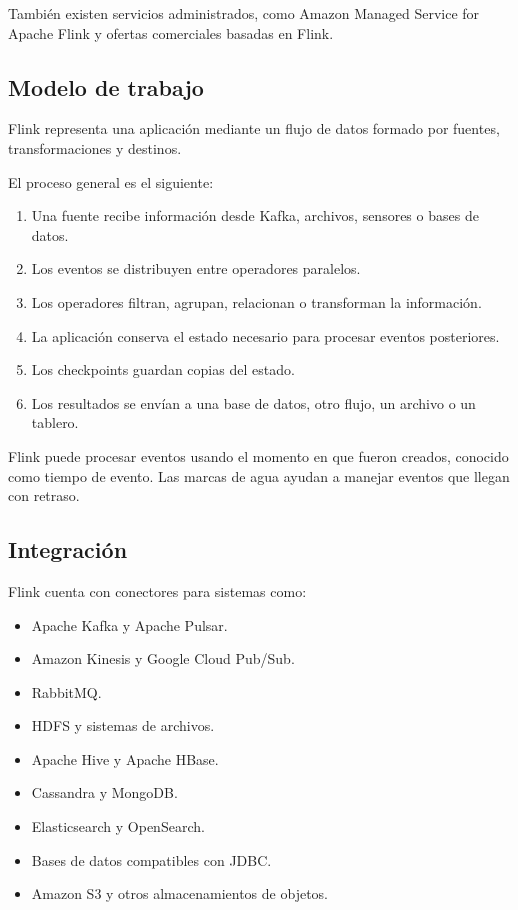 También existen servicios administrados, como Amazon Managed Service for
Apache Flink y ofertas comerciales basadas en Flink.

\subsection{Modelo de trabajo}

Flink representa una aplicación mediante un flujo de datos formado por
fuentes, transformaciones y destinos.

El proceso general es el siguiente:

\begin{enumerate}
    \item Una fuente recibe información desde Kafka, archivos, sensores o bases
    de datos.
    
    \item Los eventos se distribuyen entre operadores paralelos.
    
    \item Los operadores filtran, agrupan, relacionan o transforman la
    información.
    
    \item La aplicación conserva el estado necesario para procesar eventos
    posteriores.
    
    \item Los checkpoints guardan copias del estado.
    
    \item Los resultados se envían a una base de datos, otro flujo, un archivo
    o un tablero.
\end{enumerate}

Flink puede procesar eventos usando el momento en que fueron creados, conocido
como tiempo de evento. Las marcas de agua ayudan a manejar eventos que llegan
con retraso.

\subsection{Integración}

Flink cuenta con conectores para sistemas como:

\begin{itemize}
    \item Apache Kafka y Apache Pulsar.
    \item Amazon Kinesis y Google Cloud Pub/Sub.
    \item RabbitMQ.
    \item HDFS y sistemas de archivos.
    \item Apache Hive y Apache HBase.
    \item Cassandra y MongoDB.
    \item Elasticsearch y OpenSearch.
    \item Bases de datos compatibles con JDBC.
    \item Amazon S3 y otros almacenamientos de objetos.
\end{itemize}


